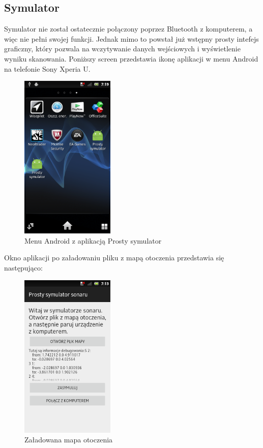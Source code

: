 \documentclass[a4paper,12pt]{article}
\begin{document}
\subsection{Symulator}
Symulator nie został ostatecznie połączony poprzez Bluetooth z komputerem, a więc nie pełni swojej funkcji. Jednak mimo to powstał już wstępny prosty intefejs graficzny, który pozwala na wczytywanie danych wejściowych i wyświetlenie wyniku skanowania.
\newline
Poniższy screen przedstawia ikonę aplikacji w menu Android na telefonie Sony Xperia U.
\begin{figure} [H]
\centering
\includegraphics[height=300px]{s1.png}
\caption{Menu Android z aplikacją Prosty symulator}
\label{s1}
\end{figure}
Okno aplikacji po załadowaniu pliku z mapą otoczenia przedstawia się następująco:
\begin{figure} [H]
\centering
\includegraphics[height=300px]{s4.png}
\caption{Załadowana mapa otoczenia}
\label{s4}
\end{figure}
\end{document}

